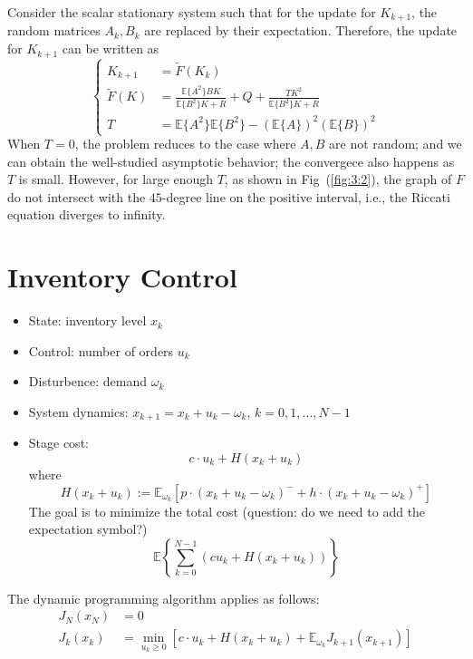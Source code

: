 Consider the scalar stationary system such that for the update for $K_{k+1}$, the random matrices $A_k,B_k$ are replaced by their expectation. Therefore, the update for $K_{k+1}$ can be written as
\[
\left\{
\begin{aligned}
K_{k+1}&=\tilde{F}(K_k)\\
\tilde{F}(K)&=\frac{\mathbb{E}\{A^2\}BK}{\mathbb{E}\{B^2\}K+R}+Q+\frac{TK^2}{\mathbb{E}\{B^2\}K+R}\\
T&=\mathbb{E}\{A^2\}\mathbb{E}\{B^2\} - (\mathbb{E}\{A\})^2(\mathbb{E}\{B\})^2
\end{aligned}
\right.
\]
When $T=0$, the problem reduces to the case where $A,B$ are not random; and we can obtain the well-studied asymptotic behavior; 
the convergece also happens as $T$ is small.
However, for large enough $T$, as shown in Fig~(\ref{fig:3:2}), the graph of $F$ do not intersect with the $45$-degree line on the positive interval, i.e., the Riccati equation diverges to infinity.


\section{Inventory Control}
\begin{itemize}
\item
State: inventory level $x_k$
\item
Control: number of orders $u_k$
\item
Disturbence: demand $\omega_k$
\item
System dynamics: $x_{k+1} = x_k + u_k -\omega_k$, $k=0,1,\dots,N-1$
\item
Stage cost:
\[
c\cdot u_k + H(x_k + u_k)
\]
where 
\[
H(x_k + u_k):=
\mathbb{E}_{\omega_k}
\left[
p\cdot(x_k+u_k-\omega_k)^- 
+
h\cdot(x_k+u_k-\omega_k)^+
\right]
\]
The goal is to minimize the total cost (question: do we need to add the expectation symbol?)
\[
\mathbb{E}\left\{\sum_{k=0}^{N-1}(cu_k + H(x_k+u_k))\right\}
\]
\end{itemize}

The dynamic programming algorithm applies as follows:
\begin{align*}
J_N(x_N)&=0\\
J_k(x_k)
&=
\min_{u_k\ge0}
\left[
c\cdot u_k
+
H(x_k+u_k)
+
\mathbb{E}_{\omega_k}
J_{k+1}(x_{k+1})
\right]
\end{align*}
